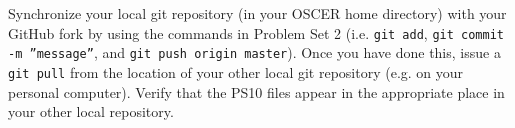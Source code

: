 \documentclass[12pt,english]{exam}
\begin{document}
\begin{questions}
\question Synchronize your local git repository (in your OSCER home directory) with your GitHub fork by using the commands in Problem Set 2 (i.e. \texttt{git add}, \texttt{git commit -m ''message''}, and \texttt{git push origin master}). Once you have done this, issue a \texttt{git pull} from the location of your other local git repository (e.g. on your personal computer). Verify that the PS10 files appear in the appropriate place in your other local repository.

\end{questions}
\end{document}

